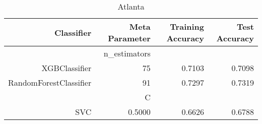 
\begin{table}[H]
    \caption{Atlanta}
    \centering
    \begin{tabular}{|r|r|r|r|}
        \hline
        Classifier &Meta Parameter &Training Accuracy
        &Test Accuracy\\
        \hline
        &n\_estimators &\multicolumn{2}{|r|}{}\\
        \hline
        XGBClassifier &75 &0.7103 &0.7098\\
        \hline
        RandomForestClassifier &91 &0.7297 &0.7319\\
        \hline
        &C &\multicolumn{2}{|r|}{}\\
        \hline
        SVC &0.5000 &0.6626 &0.6788\\
        \hline
    \end{tabular}
\end{table}
